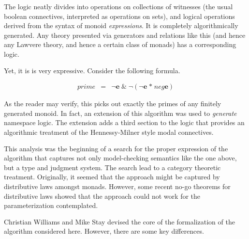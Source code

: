 The logic neatly divides into operations on collections of witnesses
(the usual boolean connectives, interpreted as operations on sets),
and logical operations derived from the syntax of monoid
\emph{expressions}. It is completely algorithmically generated. Any
theory presented via generators and relations like this (and hence any
Lawvere theory, and hence a certain class of monads) has a
corresponding logic.

Yet, it is is very expressive. Consider the following formula.

\begin{eqnarray*}
  prime & = & \neg \mathbf{e} \; \& \; \neg (\neg \mathbf{e} \; \mathbf{*}\; neg \mathbf{e})
\end{eqnarray*}

As the reader may verify, this picks out exactly the primes of any
finitely generated monoid. In fact, an extension of this algorithm was
used to \emph{generate} namespace logic. The extension adds a third
section to the logic that provides an algorithmic treatment of the
Hennessy-Milner style modal connectives.

This analysis was the beginning of a search for the proper expression
of the algorithm that captures not only model-checking semantics like
the one above, but a type and judgment system. The search lead to a
category theoretic treatment. Originally, it seemed that the approach
might be captured by distributive laws amongst monads. However, some
recent no-go theorems for distributive laws showed that the approach
could not work for the parameterization contemplated.

Christian Williams and Mike Stay devised the core of the formalization
of the algorithm considered here. However, there are some key
differences.


